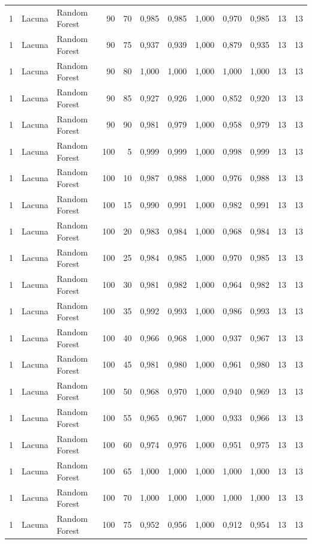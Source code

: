 \begin{longtable}{@{}rllrrrrrrrrr@{}}
1 & Lacuna & Random Forest & 90 & 70 & 0,985 & 0,985 & 1,000 & 0,970 & 0,985 & 13 & 13 \\
1 & Lacuna & Random Forest & 90 & 75 & 0,937 & 0,939 & 1,000 & 0,879 & 0,935 & 13 & 13 \\
1 & Lacuna & Random Forest & 90 & 80 & 1,000 & 1,000 & 1,000 & 1,000 & 1,000 & 13 & 13 \\
1 & Lacuna & Random Forest & 90 & 85 & 0,927 & 0,926 & 1,000 & 0,852 & 0,920 & 13 & 13 \\
1 & Lacuna & Random Forest & 90 & 90 & 0,981 & 0,979 & 1,000 & 0,958 & 0,979 & 13 & 13 \\
1 & Lacuna & Random Forest & 100 & 5 & 0,999 & 0,999 & 1,000 & 0,998 & 0,999 & 13 & 13 \\
1 & Lacuna & Random Forest & 100 & 10 & 0,987 & 0,988 & 1,000 & 0,976 & 0,988 & 13 & 13 \\
1 & Lacuna & Random Forest & 100 & 15 & 0,990 & 0,991 & 1,000 & 0,982 & 0,991 & 13 & 13 \\
1 & Lacuna & Random Forest & 100 & 20 & 0,983 & 0,984 & 1,000 & 0,968 & 0,984 & 13 & 13 \\
1 & Lacuna & Random Forest & 100 & 25 & 0,984 & 0,985 & 1,000 & 0,970 & 0,985 & 13 & 13 \\
1 & Lacuna & Random Forest & 100 & 30 & 0,981 & 0,982 & 1,000 & 0,964 & 0,982 & 13 & 13 \\
1 & Lacuna & Random Forest & 100 & 35 & 0,992 & 0,993 & 1,000 & 0,986 & 0,993 & 13 & 13 \\
1 & Lacuna & Random Forest & 100 & 40 & 0,966 & 0,968 & 1,000 & 0,937 & 0,967 & 13 & 13 \\
1 & Lacuna & Random Forest & 100 & 45 & 0,981 & 0,980 & 1,000 & 0,961 & 0,980 & 13 & 13 \\
1 & Lacuna & Random Forest & 100 & 50 & 0,968 & 0,970 & 1,000 & 0,940 & 0,969 & 13 & 13 \\
1 & Lacuna & Random Forest & 100 & 55 & 0,965 & 0,967 & 1,000 & 0,933 & 0,966 & 13 & 13 \\
1 & Lacuna & Random Forest & 100 & 60 & 0,974 & 0,976 & 1,000 & 0,951 & 0,975 & 13 & 13 \\
1 & Lacuna & Random Forest & 100 & 65 & 1,000 & 1,000 & 1,000 & 1,000 & 1,000 & 13 & 13 \\
1 & Lacuna & Random Forest & 100 & 70 & 1,000 & 1,000 & 1,000 & 1,000 & 1,000 & 13 & 13 \\
1 & Lacuna & Random Forest & 100 & 75 & 0,952 & 0,956 & 1,000 & 0,912 & 0,954 & 13 & 13 \\

\end{longtable}
